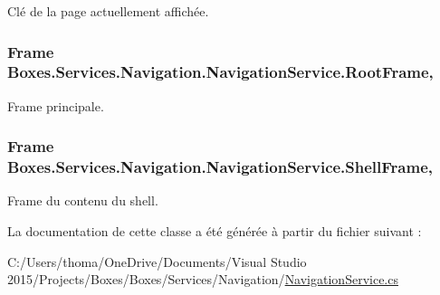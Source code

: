 Clé de la page actuellement affichée. 

\subsubsection[{\texorpdfstring{Root\+Frame}{RootFrame}}]{\setlength{\rightskip}{0pt plus 5cm}Frame Boxes.\+Services.\+Navigation.\+Navigation\+Service.\+Root\+Frame\hspace{0.3cm}{\ttfamily [get]}, {\ttfamily [private]}}\hypertarget{class_boxes_1_1_services_1_1_navigation_1_1_navigation_service_a6735d62868cecd7fdb84b66bb7995abf}{}\label{class_boxes_1_1_services_1_1_navigation_1_1_navigation_service_a6735d62868cecd7fdb84b66bb7995abf}


Frame principale. 

\subsubsection[{\texorpdfstring{Shell\+Frame}{ShellFrame}}]{\setlength{\rightskip}{0pt plus 5cm}Frame Boxes.\+Services.\+Navigation.\+Navigation\+Service.\+Shell\+Frame\hspace{0.3cm}{\ttfamily [get]}, {\ttfamily [private]}}\hypertarget{class_boxes_1_1_services_1_1_navigation_1_1_navigation_service_ab894fb70e405311074f5e0122fece0ff}{}\label{class_boxes_1_1_services_1_1_navigation_1_1_navigation_service_ab894fb70e405311074f5e0122fece0ff}


Frame du contenu du shell. 



La documentation de cette classe a été générée à partir du fichier suivant \+:\begin{DoxyCompactItemize}
\item 
C\+:/\+Users/thoma/\+One\+Drive/\+Documents/\+Visual Studio 2015/\+Projects/\+Boxes/\+Boxes/\+Services/\+Navigation/\hyperlink{_navigation_service_8cs}{Navigation\+Service.\+cs}\end{DoxyCompactItemize}
